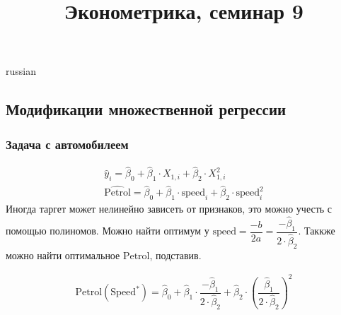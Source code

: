 \documentclass{article}
\begin{document}
\title{\foreignlanguage{russian}{Эконометрика, семинар 9}}
\maketitle
\begin{otherlanguage*}{russian}
\subsection*{Модификации множественной регрессии}
\subsubsection*{Задача с автомобилеем}
\begin{align*}
\hat y_i = \hat \beta_0 + \hat \beta_1 \cdot X_{1, i } + \hat \beta_2 \cdot X_{1, i} ^ 2 \\
\widehat{\text{Petrol}} = \hat \beta_0 + \hat \beta_1 \cdot \text{speed}_i + \hat \beta_2 \cdot \text{speed}_i^2   
\end{align*}
Иногда таргет может нелинейно зависеть от признаков, это можно учесть с помощью полиномов. 
Можно найти оптимум у $ \text{speed} = \dfrac{-b}{2a} =\dfrac{- \hat \beta_1}{2 \cdot \hat \beta_2}$. Таккже можно найти оптимальное $ \text{Petrol} $, подставив.

\begin{align*}
\text{Petrol}(\text{Speed}^*) = \hat \beta_0 + \hat \beta_1 \cdot \dfrac{- \hat \beta_1}{2 \cdot \hat \beta_2} + \hat \beta_2 \cdot (\dfrac{\hat \beta_1}{2 \cdot \hat \beta_2})^2
\end{align*} 

\end{otherlanguage*}
\end{document}
